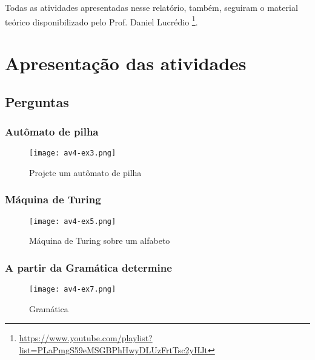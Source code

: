 \documentclass[
	12pt,				%
	openright,			%
	twoside,			%
	a4paper,			%
	english,			%
	french,				%
	spanish,			%
	brazil,				%
	]{abntex2}
\begin{document}
Todas as atividades apresentadas nesse relatório, também, seguiram o material teórico disponibilizado pelo Prof. Daniel Lucrédio \cite{lucredio} \footnote{\url{https://www.youtube.com/playlist?list=PLaPmgS59eMSGBPhHwyDLUzFrtTsc2yHJt}}.


\part{Apresentação das atividades}
\chapter{Perguntas}
\section{Autômato de pilha}
\begin{figure}[h]
  \begin{center}
    \texttt{[image: av4-ex3.png]} \\
    \caption{Projete um autômato de pilha} \label{77}

  \end{center}
 \end{figure}


 \section{Máquina de Turing}
  \begin{figure}[h]
   \begin{center}
     \texttt{[image: av4-ex5.png]} \\
     \caption{Máquina de Turing sobre um alfabeto} \label{2}

   \end{center}
  \end{figure}

 \section{A partir da Gramática determine}
  \begin{figure}[h]
   \begin{center}
     \texttt{[image: av4-ex7.png]} \\
     \caption{Gramática} \label{7}

   \end{center}
  \end{figure}
\end{document}
